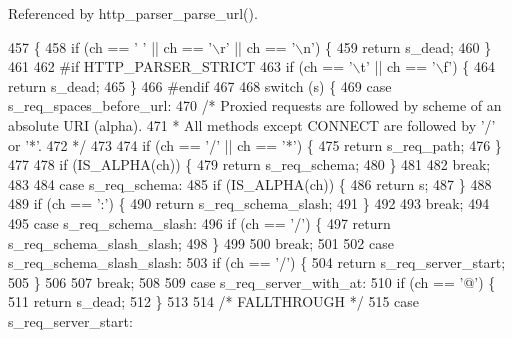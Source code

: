 Referenced by http\+\_\+parser\+\_\+parse\+\_\+url().


\begin{DoxyCode}
457 \{
458   \textcolor{keywordflow}{if} (ch == \textcolor{charliteral}{' '} || ch == \textcolor{charliteral}{'\(\backslash\)r'} || ch == \textcolor{charliteral}{'\(\backslash\)n'}) \{
459     \textcolor{keywordflow}{return} s_dead;
460   \}
461 
462 \textcolor{preprocessor}{#if HTTP\_PARSER\_STRICT}
463   \textcolor{keywordflow}{if} (ch == \textcolor{charliteral}{'\(\backslash\)t'} || ch == \textcolor{charliteral}{'\(\backslash\)f'}) \{
464     \textcolor{keywordflow}{return} s_dead;
465   \}
466 \textcolor{preprocessor}{#endif}
467 
468   \textcolor{keywordflow}{switch} (s) \{
469     \textcolor{keywordflow}{case} s_req_spaces_before_url:
470       \textcolor{comment}{/* Proxied requests are followed by scheme of an absolute URI (alpha).}
471 \textcolor{comment}{       * All methods except CONNECT are followed by '/' or '*'.}
472 \textcolor{comment}{       */}
473 
474       \textcolor{keywordflow}{if} (ch == \textcolor{charliteral}{'/'} || ch == \textcolor{charliteral}{'*'}) \{
475         \textcolor{keywordflow}{return} s_req_path;
476       \}
477 
478       \textcolor{keywordflow}{if} (IS_ALPHA(ch)) \{
479         \textcolor{keywordflow}{return} s_req_schema;
480       \}
481 
482       \textcolor{keywordflow}{break};
483 
484     \textcolor{keywordflow}{case} s_req_schema:
485       \textcolor{keywordflow}{if} (IS_ALPHA(ch)) \{
486         \textcolor{keywordflow}{return} s;
487       \}
488 
489       \textcolor{keywordflow}{if} (ch == \textcolor{charliteral}{':'}) \{
490         \textcolor{keywordflow}{return} s_req_schema_slash;
491       \}
492 
493       \textcolor{keywordflow}{break};
494 
495     \textcolor{keywordflow}{case} s_req_schema_slash:
496       \textcolor{keywordflow}{if} (ch == \textcolor{charliteral}{'/'}) \{
497         \textcolor{keywordflow}{return} s_req_schema_slash_slash;
498       \}
499 
500       \textcolor{keywordflow}{break};
501 
502     \textcolor{keywordflow}{case} s_req_schema_slash_slash:
503       \textcolor{keywordflow}{if} (ch == \textcolor{charliteral}{'/'}) \{
504         \textcolor{keywordflow}{return} s_req_server_start;
505       \}
506 
507       \textcolor{keywordflow}{break};
508 
509     \textcolor{keywordflow}{case} s_req_server_with_at:
510       \textcolor{keywordflow}{if} (ch == \textcolor{charliteral}{'@'}) \{
511         \textcolor{keywordflow}{return} s_dead;
512       \}
513 
514     \textcolor{comment}{/* FALLTHROUGH */}
515     \textcolor{keywordflow}{case} s_req_server_start:

\end{DoxyCode}
